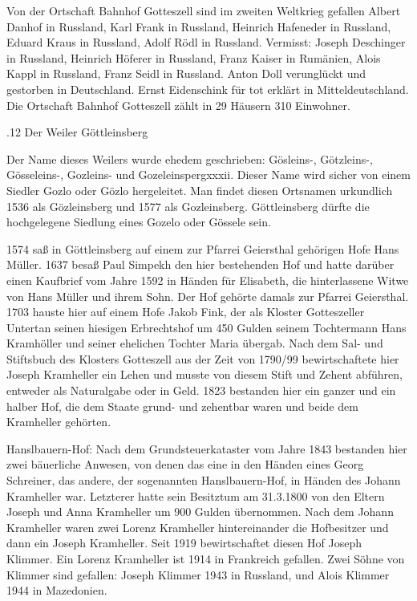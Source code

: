 Von der Ortschaft Bahnhof Gotteszell sind im zweiten Weltkrieg gefallen Albert
Danhof in Russland, Karl Frank in Russland, Heinrich Hafeneder in Russland,
Eduard Kraus in Russland, Adolf Rödl in Russland. Vermisst: Joseph Deschinger in
Russland, Heinrich Höferer in Russland, Franz Kaiser in Rumänien, Alois Kappl in
Russland, Franz Seidl in Russland. Anton Doll verunglückt und gestorben in
Deutschland. Ernst Eidenschink für tot erklärt in Mitteldeutschland. Die
Ortschaft Bahnhof Gotteszell zählt in 29 Häusern 310 Einwohner.

.12 Der Weiler Göttleinsberg

Der Name dieses Weilers wurde ehedem geschrieben: Gösleins-, Götzleins-,
Gösseleins-, Gozleins- und Gozeleinspergxxxii. Dieser Name wird sicher von einem
Siedler Gozlo oder Gözlo hergeleitet. Man findet diesen Ortsnamen urkundlich
1536 als Gözleinsberg und 1577 als Gozleinsberg. Göttleinsberg dürfte die
hochgelegene Siedlung eines Gozelo oder Gössele sein.

1574 saß in Göttleinsberg auf einem zur Pfarrei Geiersthal gehörigen Hofe Hans
Müller. 1637 besaß Paul Simpekh den hier bestehenden Hof und hatte darüber einen
Kaufbrief vom Jahre 1592 in Händen für Elisabeth, die hinterlassene Witwe von
Hans Müller und ihrem Sohn. Der Hof gehörte damals zur Pfarrei Geiersthal. 1703
hauste hier auf einem Hofe Jakob Fink, der als Kloster Gotteszeller Untertan
seinen hiesigen Erbrechtshof um 450 Gulden seinem Tochtermann Hans Kramhöller
und seiner ehelichen Tochter Maria übergab. Nach dem Sal- und Stiftsbuch des
Klosters Gotteszell aus der Zeit von 1790/99 bewirtschaftete hier Joseph
Kramheller ein Lehen und musste von diesem Stift und Zehent abführen, entweder
als Naturalgabe oder in Geld. 1823 bestanden hier ein ganzer und ein halber Hof,
die dem Staate grund- und zehentbar waren und beide dem Kramheller gehörten.

Hanslbauern-Hof: Nach dem Grundsteuerkataster vom Jahre 1843 bestanden hier zwei
bäuerliche Anwesen, von denen das eine in den Händen eines Georg Schreiner, das
andere, der sogenannten Hanslbauern-Hof, in Händen des Johann Kramheller war.
Letzterer hatte sein Besitztum am 31.3.1800 von den Eltern Joseph und Anna
Kramheller um 900 Gulden übernommen. Nach dem Johann Kramheller waren zwei
Lorenz Kramheller hintereinander die Hofbesitzer und dann ein Joseph Kramheller.
Seit 1919 bewirtschaftet diesen Hof Joseph Klimmer. Ein Lorenz Kramheller ist
1914 in Frankreich gefallen. Zwei Söhne von Klimmer sind gefallen: Joseph
Klimmer 1943 in Russland, und Alois Klimmer 1944 in Mazedonien.

